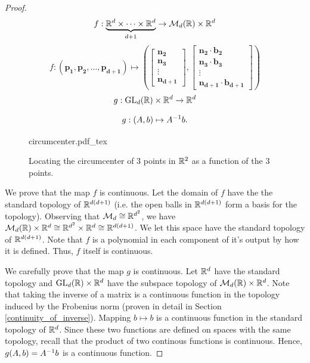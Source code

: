 \documentclass[letterpaper,titlepage]{article}
\newcommand{\incfig}[1]{%
    {#1.pdf_tex}
}
\begin{document}
\begin{proof}
        $$f:\underbrace{\mathbb{R}^d \times \dots \times \mathbb{R}^d}_{d+1} \to \mathcal{M}_{d}(\mathbb{R})\times \mathbb{R}^d$$
        $$f:(\mathbf{p_1},\mathbf{p_2},\dots,\mathbf{p_{d+1}}) \mapsto \left(\begin{bmatrix}
            \mathbf{n_2}\\ \mathbf{n_3}\\ \vdots\\ \mathbf{n_{d+1}}
        \end{bmatrix},
        \begin{bmatrix}
            \mathbf{n_2}\cdot\mathbf{b_2} \\ \mathbf{n_3}\cdot\mathbf{b_3}\\ \vdots \\ \mathbf{n_{d+1}}\cdot\mathbf{b_{d+1}}
        \end{bmatrix}\right)$$
        $$g:\text{GL}_d(\mathbb{R})\times \mathbb{R}^d \to \mathbb{R}^d$$
       
            
        $$g:(A,b) \mapsto A^{-1} b.$$
        \begin{figure}[ht]
            \centering
            \def\svgwidth{.7\textwidth}
            \incfig{circumcenter}
            \caption{Locating the circumcenter of 3 points in $\mathbb{R}^2$ as a function of the 3 points.}
            \label{fig:circumcenter}
        \end{figure}
        We prove that the map $f$ is continuous. Let the domain of $f$ have the the standard topology of $\mathbb{R}^{d(d+1)}$ (i.e. the open balls in $\mathbb{R}^{d(d+1)}$ form a basis for the topology). Observing that $\mathcal{M}_{d} \cong \mathbb{R}^{d^2}$, we have $\mathcal{M}_{d}(\mathbb{R})\times \mathbb{R}^d \cong \mathbb{R}^{d^2}\times \mathbb{R}^d \cong \mathbb{R}^{d(d+1)}$. We let this space have the standard topology of $\mathbb{R}^{d(d+1)}$. Note that $f$ is a polynomial in each component of it's output by how it is defined. Thus, $f$ itself is continuous.

        We carefully prove that the map $g$ is continuous. Let $\mathbb{R}^d$ have the standard topology and $\text{GL}_d(\mathbb{R})\times \mathbb{R}^d$ have the subspace topology of $\mathcal{M}_{d}(\mathbb{R})\times \mathbb{R}^d$. Note that taking the inverse of a matrix is a continuous function in the topology induced by the Frobenius norm (proven in detail in Section \ref{continuity_of_inverse}). Mapping $b \mapsto b$ is a continuous function in the standard topology of $\mathbb{R}^d$. Since these two functions are defined on spaces with the same topology, recall that the product of two continous functions is continuous. Hence, $g(A,b)=A^{-1} b$ is a continuous function.
        

\end{proof}
\end{document}
